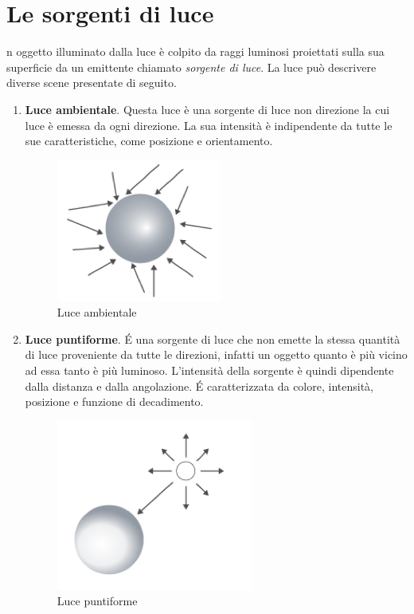 \documentclass[9pt,a4paper,twoside]{tau}
\begin{document}
\section{Le sorgenti di luce}
n oggetto illuminato dalla luce è colpito da raggi luminosi proiettati sulla sua superficie da un emittente chiamato \textit{sorgente di luce}. La luce può descrivere diverse scene presentate di seguito.
\begin{enumerate}
    	\item \textbf{Luce ambientale}. Questa luce è una sorgente di luce non direzione la cui luce è emessa da ogni direzione. La sua intensità è indipendente da tutte le sue caratteristiche, come posizione e orientamento.
    		\begin{figure}[H]
        		\centering
       			\includegraphics[width=0.3\columnwidth]{Figures/01.png}
       	 		\caption{Luce ambientale}
        		\label{fig:figure}
			\end{figure}
		
    	\item \textbf{Luce puntiforme}. \'E una sorgente di luce che non emette la stessa quantità di luce proveniente da tutte le direzioni, infatti un oggetto quanto è più vicino ad essa tanto è più luminoso. L'intensità della sorgente è quindi dipendente dalla distanza e dalla angolazione. \'E caratterizzata da colore, intensità, posizione e funzione di decadimento.
    		\begin{figure}[H]
        		\centering
        		\includegraphics[width=0.3\columnwidth]{Figures/02.png}
        		\caption{Luce puntiforme}
       			\label{fig:figure}
			\end{figure}   
    	

\end{enumerate}
\end{document}
